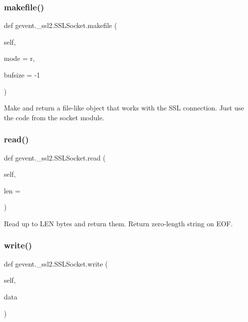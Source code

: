 \subsubsection{\texorpdfstring{makefile()}{makefile()}}
{\footnotesize\ttfamily def gevent.\+\_\+ssl2.\+S\+S\+L\+Socket.\+makefile (\begin{DoxyParamCaption}\item[{}]{self,  }\item[{}]{mode = {\ttfamily \textquotesingle{}r\textquotesingle{}},  }\item[{}]{bufsize = {\ttfamily -\/1} }\end{DoxyParamCaption})}

\begin{DoxyVerb}Make and return a file-like object that
works with the SSL connection.  Just use the code
from the socket module.\end{DoxyVerb}
 \mbox{\label{classgevent_1_1__ssl2_1_1_s_s_l_socket_a462b66da5f2191f6ab8e43b204b46b27}} 
\subsubsection{\texorpdfstring{read()}{read()}}
{\footnotesize\ttfamily def gevent.\+\_\+ssl2.\+S\+S\+L\+Socket.\+read (\begin{DoxyParamCaption}\item[{}]{self,  }\item[{}]{len = {} }\end{DoxyParamCaption})}

\begin{DoxyVerb}Read up to LEN bytes and return them.
Return zero-length string on EOF.\end{DoxyVerb}
 \mbox{\label{classgevent_1_1__ssl2_1_1_s_s_l_socket_a06d8fc5ea8b75760fc6a972966d453e2}} 
\subsubsection{\texorpdfstring{write()}{write()}}
{\footnotesize\ttfamily def gevent.\+\_\+ssl2.\+S\+S\+L\+Socket.\+write (\begin{DoxyParamCaption}\item[{}]{self,  }\item[{}]{data }\end{DoxyParamCaption})}

